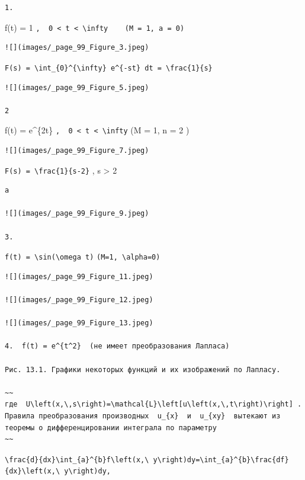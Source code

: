 \documentclass[
  ukrainian,
]{article}
\begin{document}
\begin{verbatim}
1.
\end{verbatim}

f(t) = 1
\texttt{,\ \ 0\ \textless{}\ t\ \textless{}\ \textbackslash{}infty\ \ \ \ (M\ =\ 1,\ a\ =\ 0)}

\begin{verbatim}
![](images/_page_99_Figure_3.jpeg)
\end{verbatim}

\texttt{F(s)\ =\ \textbackslash{}int\_\{0\}\^{}\{\textbackslash{}infty\}\ e\^{}\{-st\}\ dt\ =\ \textbackslash{}frac\{1\}\{s\}}

\begin{verbatim}
![](images/_page_99_Figure_5.jpeg)

2
\end{verbatim}

f(t) = e\^{}\{2t\}
\texttt{,\ \ 0\ \textless{}\ t\ \textless{}\ \textbackslash{}infty} (M =
1, n = 2 )

\begin{verbatim}
![](images/_page_99_Figure_7.jpeg)
\end{verbatim}

\texttt{F(s)\ =\ \textbackslash{}frac\{1\}\{s-2\}} , s \textgreater{} 2

\begin{verbatim}
a

![](images/_page_99_Figure_9.jpeg)

3.
\end{verbatim}

\texttt{f(t)\ =\ \textbackslash{}sin(\textbackslash{}omega\ t)}
\texttt{(M=1,\ \textbackslash{}alpha=0)}

\begin{verbatim}
![](images/_page_99_Figure_11.jpeg)

![](images/_page_99_Figure_12.jpeg)

![](images/_page_99_Figure_13.jpeg)

4.  f(t) = e^{t^2}  (не имеет преобразования Лапласа)

Рис. 13.1. Графики некоторых функций и их изображений по Лапласу.

~~
где  U\left(x,\,s\right)=\mathcal{L}\left[u\left(x,\,t\right)\right] . Правила преобразования производных  u_{x}  и  u_{xy}  вытекают из теоремы о дифференцировании интеграла по параметру
~~
\end{verbatim}

\texttt{\textbackslash{}frac\{d\}\{dx\}\textbackslash{}int\_\{a\}\^{}\{b\}f\textbackslash{}left(x,\textbackslash{}\ y\textbackslash{}right)dy=\textbackslash{}int\_\{a\}\^{}\{b\}\textbackslash{}frac\{df\}\{dx\}\textbackslash{}left(x,\textbackslash{}\ y\textbackslash{}right)dy,}
\end{document}
